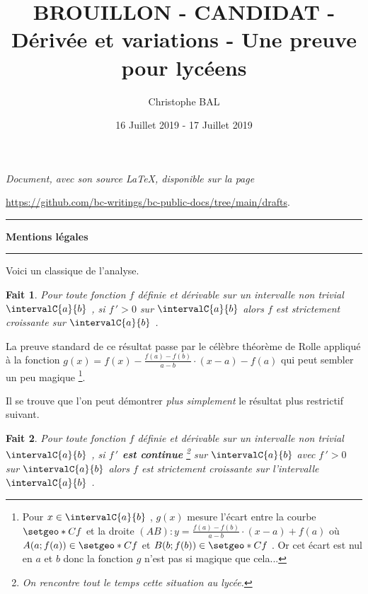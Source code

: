 \documentclass[12pt]{amsart}
\newtheorem{fact}{Fait}
\begin{document}
\title{BROUILLON - CANDIDAT - Dérivée et variations - Une preuve pour lycéens}
\author{Christophe BAL}
\date{16 Juillet 2019 - 17 Juillet 2019}

\maketitle

\begin{center}
	\itshape
	Document, avec son source \LaTeX, disponible sur la page

	\url{https://github.com/bc-writings/bc-public-docs/tree/main/drafts}.
\end{center}


\bigskip


\begin{center}
	\hrule\vspace{.3em}
	{
		\fontsize{1.35em}{1em}\selectfont
		\textbf{Mentions \og légales \fg}
	}

	\vspace{0.45em}
	\doclicenseThis
	\hrule
\end{center}


\vspace{1em}


Voici un classique de l'analyse.


\begin{fact}
	Pour toute fonction $f$ définie et dérivable sur un intervalle non trivial $\intervalC{a}{b}$ , si $f\,' > 0$ sur $\intervalC{a}{b}$ alors $f$ est strictement croissante sur $\intervalC{a}{b}$ .
\end{fact}

La preuve standard de ce résultat passe par le célèbre théorème de Rolle appliqué à la fonction $g(x) = f(x) - \frac{f(a) - f(b)}{a - b} \cdot (x - a) - f(a)$ qui peut sembler un peu magique
\footnote{
	Pour $x \in \intervalC{a}{b}$ , $g(x)$ mesure l'écart entre la courbe $\setgeo*{C}{f}$ et la droite $(AB) : y = \frac{f(a) - f(b)}{a - b} \cdot (x - a) + f(a)$ où $A(a ; f(a)) \in \setgeo*{C}{f}$ et $B(b ; f(b)) \in \setgeo*{C}{f}$ .
	Or cet écart est nul en $a$ et $b$ donc la fonction $g$ n'est pas si magique que cela...
}.


\bigskip


Il se trouve que l'on peut démontrer \emph{\og plus simplement \fg} le résultat plus restrictif suivant.


\begin{fact}
	Pour toute fonction $f$ définie et dérivable sur un intervalle non trivial $\intervalC{a}{b}$ ,
	si \textbf{$f\,'$ est continue}
	\footnote{
		On rencontre tout le temps cette situation au lycée.
	}
	sur $\intervalC{a}{b}$ avec $f\,' > 0$ sur $\intervalC{a}{b}$
	alors $f$ est strictement croissante sur l'intervalle $\intervalC{a}{b}$ .
\end{fact}
\end{document}
